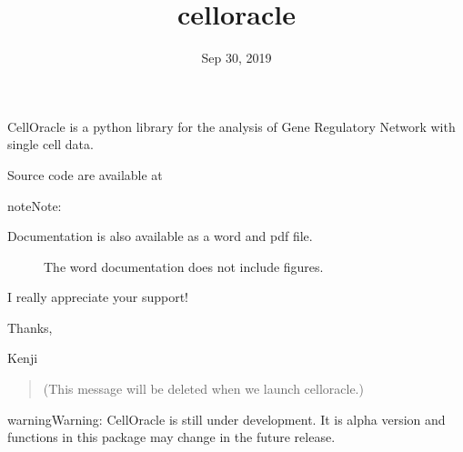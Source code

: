 \documentclass[letterpaper,10pt,english]{sphinxmanual}
\title{celloracle}
\date{Sep 30, 2019}
\author{}
\begin{document}
\maketitle
\sphinxtableofcontents
{}\label{\detokenize{index::doc}}


CellOracle is a python library for the analysis of Gene Regulatory Network with single cell data.

Source code are available at 

\begin{sphinxadmonition}{note}{Note:}
\begin{DUlineblock}{0em}
\item[] 
\item[] 
\end{DUlineblock}

\begin{DUlineblock}{0em}
\item[] Documentation is also available as a word and pdf file.
\end{DUlineblock}

\begin{description}
\item[{}] \leavevmode
The word documentation does not include figures.

\end{description}

\begin{DUlineblock}{0em}
\item[] 
\item[] I really appreciate your support!
\item[] 
\item[] Thanks,
\item[] Kenji
\end{DUlineblock}
\begin{quote}

(This message will be deleted when we launch celloracle.)
\end{quote}
\end{sphinxadmonition}

\begin{sphinxadmonition}{warning}{Warning:}
CellOracle is still under development. It is alpha version and functions in this package may change in the future release.
\end{sphinxadmonition}
\end{document}
